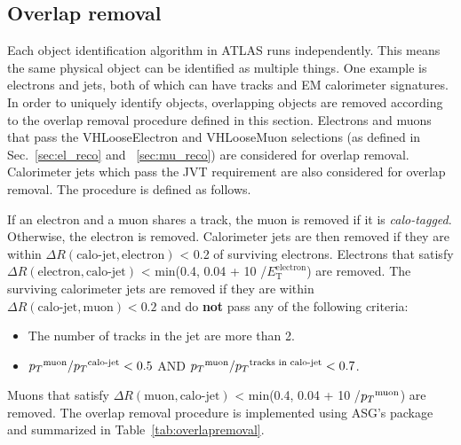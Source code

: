 \subsection{Overlap removal}
\label{sec:overlapremoval}
Each object identification algorithm in ATLAS runs independently. This means the same physical object can be identified as multiple things. One example is electrons and jets, both of which can have tracks and EM calorimeter signatures. In order to uniquely identify objects, overlapping objects are removed according to the overlap removal procedure defined in this section. 
Electrons and muons that pass the VHLooseElectron and VHLooseMuon selections (as defined in Sec.~\ref{sec:el_reco} and ~\ref{sec:mu_reco}) are considered for overlap removal. 
Calorimeter jets which pass the JVT requirement are also considered for overlap removal. The procedure is defined as follows.

If an electron and a muon shares a track, the muon is removed if it is \textit{calo-tagged}. Otherwise, the electron is removed.
Calorimeter jets are then removed if they are within $\Delta R(\text{calo-jet}, \text{electron})$ < 0.2 of surviving electrons. 
Electrons that satisfy $\Delta R(\text{electron},\text{calo-jet})$ < min(0.4, 0.04 + 10 \GeV /$E^\text{electron}_\text{T}$) are removed. 
The surviving calorimeter jets are removed if they are within $\Delta R(\text{calo-jet}, \text{muon}) < 0.2$ and 
do \textbf{not} pass any of the following criteria:

\begin{itemize}
\item The number of tracks in the jet are more than 2.
\item $\pt^{\text{muon}} / \pt^{\text{calo-jet}} < 0.5$  AND  $\pt^{\text{muon}} / \pt^{\text{tracks in calo-jet}} < 0.7$.
\end{itemize}

Muons that satisfy $\Delta R(\text{muon},\text{calo-jet})$ < min(0.4, 0.04 + 10 \GeV /$\pt^\text{muon}$) are removed. 
The overlap removal procedure is implemented using ASG's 
package and summarized in Table~\ref{tab:overlapremoval}.

